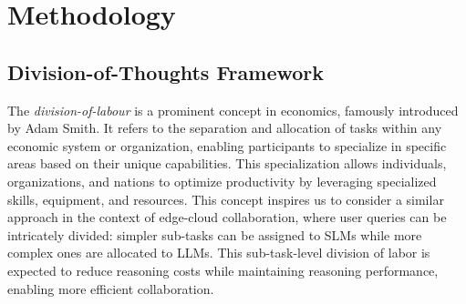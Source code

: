 \section{Methodology}



\subsection{Division-of-Thoughts Framework}
The \textit{division-of-labour} is a prominent concept in economics, famously introduced by Adam Smith. It refers to the separation and allocation of tasks within any economic system or organization, enabling participants to specialize in specific areas based on their unique capabilities. This specialization allows individuals, organizations, and nations to optimize productivity by leveraging specialized skills, equipment, and resources. This concept inspires us to consider a similar approach in the context of edge-cloud collaboration, where user queries can be intricately divided: simpler sub-tasks can be assigned to SLMs while more complex ones are allocated to LLMs. This sub-task-level division of labor is expected to reduce reasoning costs while maintaining reasoning performance, enabling more efficient collaboration. 

